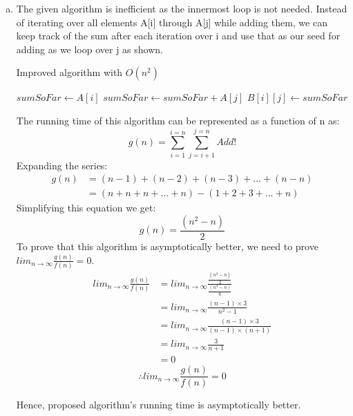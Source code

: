 \documentclass[11pt]{article}
\begin{document}
\begin{enumerate}[(a)]
	\item The given algorithm is inefficient as the innermost loop is not needed. Instead of iterating over all elements A[i] through A[j] while adding them, we can keep track of the sum after each iteration over i and use that as our seed for adding as we loop over j as shown. \\
	\begin{algorithm}
		\caption{Improved algorithm with $ O(n^2) $}
		\begin{algorithmic}[1]
				\State $ sumSoFar \gets A[i] $
					\State $ sumSoFar \gets sumSoFar + A[j] $
					\State $ B[i][j] \gets sumSoFar $
				\EndFor
			\EndFor
		\end{algorithmic}
	\end{algorithm}
	The running time of this algorithm can be represented as a function of n as:
	\begin{equation*}
		g(n) = \sum_{i=1}^{i=n} {\sum_{j=i+1}^{j=n} {Add!}}
	\end{equation*}
	Expanding the series:
	\begin{equation*}
	\begin{split}
		g(n) & = (n-1) + (n-2) + (n-3) + \ldots + (n-n) \\
		& = (n + n + n + \ldots + n) - (1 + 2 + 3 + \ldots + n)
	\end{split}
	\end{equation*}
	Simplifying this equation we get:
	\begin{equation*}
		g(n) = \frac{(n^2 - n)}{2}
	\end{equation*}
	To prove that this algorithm is asymptotically better, we need to prove $lim_{n\to\infty} \frac{g(n)}{f(n)} = 0$.
	\begin{equation*}
	\begin{split}
		lim_{n\to\infty} \frac{g(n)}{f(n)} & = lim_{n\to\infty} {\frac{\frac{(n^2 - n)}{2}}{\frac{(n^3 - n)}{6}}} \\
		& = lim_{n\to\infty} {\frac{(n - 1) \times 3}{n^2 - 1}} \\
		& = lim_{n\to\infty} {\frac{(n - 1) \times 3}{(n - 1) \times (n + 1)}} \\
		& = lim_{n\to\infty} {\frac{3}{n + 1}} \\
		& = 0
	\end{split}
	\end{equation*}
	\begin{equation*}
		\therefore lim_{n\to\infty} \frac{g(n)}{f(n)} = 0
	\end{equation*}

	Hence, proposed algorithm's running time is asymptotically better.
\end{enumerate}
\end{document}
